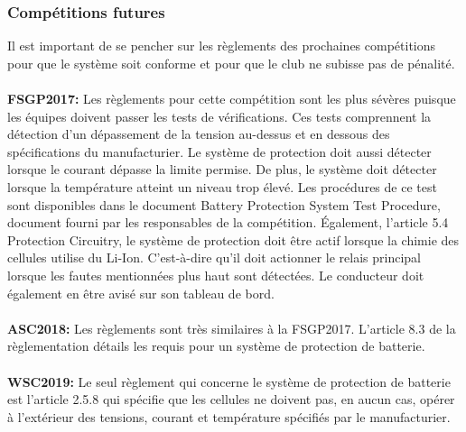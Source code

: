 	\subsubsection{Compétitions futures}
	
	Il est important de se pencher sur les règlements des prochaines compétitions pour que le système soit conforme et pour que le club ne subisse pas de pénalité.
	
	\paragraph{}   \textbf{FSGP2017:}
	 Les règlements pour cette compétition sont les plus sévères puisque les équipes doivent passer les tests de vérifications. Ces tests comprennent la détection d'un dépassement de la tension au-dessus et en dessous des spécifications du manufacturier. Le système de protection doit aussi détecter lorsque le courant dépasse la limite permise. De plus, le système doit détecter lorsque la température atteint un niveau trop élevé. Les procédures de ce test sont disponibles dans le document Battery Protection System Test Procedure, document fourni par les responsables de la compétition. Également, l'article 5.4 Protection Circuitry, le système de protection doit être actif lorsque la chimie des cellules utilise du Li-Ion. C'est-à-dire qu'il doit actionner le relais principal lorsque les fautes mentionnées plus haut sont détectées. Le conducteur doit également en être avisé sur son tableau de bord. \cite{reg_fsgp2017}
	
	\paragraph{}   \textbf{ASC2018:}
	 Les règlements sont très similaires à la FSGP2017. L'article 8.3 de la règlementation détails les requis pour un système de protection de batterie. \cite{reg_asc2018}
	
	\paragraph{}   \textbf{WSC2019:}
	 Le seul règlement qui concerne le système de protection de batterie est l'article 2.5.8 qui spécifie que les cellules ne doivent pas, en aucun cas, opérer à l'extérieur des tensions, courant et température spécifiés par le manufacturier. \cite{reg_wsc2017}